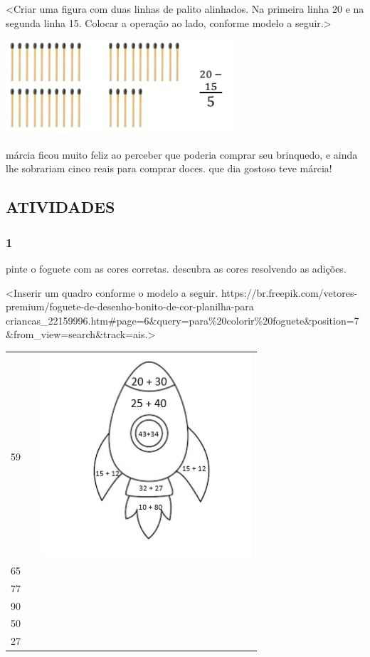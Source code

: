 \textless{}Criar uma figura com duas linhas de palito alinhados. Na
primeira linha 20 e na segunda linha 15. Colocar a operação ao lado,
conforme modelo a seguir.\textgreater{}

\includegraphics[width=3.31185in,height=1.38526in]{media/image14.png}

márcia ficou muito feliz ao perceber que poderia comprar seu brinquedo,
e ainda lhe sobrariam cinco reais para comprar doces. que dia gostoso
teve márcia!

\subsection{ATIVIDADES}\label{atividades-1}

\subsubsection{1}\label{section-8}

pinte o foguete com as cores corretas. descubra as cores resolvendo as
adições.

\textless{}Inserir um quadro conforme o modelo a seguir.
https://br.freepik.com/vetores-premium/foguete-de-desenho-bonito-de-cor-planilha-para
criancas\_22159996.htm\#page=6\&query=para\%20colorir\%20foguete\&position=7\&from\_view=search\&track=ais.\textgreater{}

\begin{longtable}[]{@{}lll@{}}
\toprule
59 & &
\includegraphics[width=3.09611in,height=2.97268in]{media/image15.png}\tabularnewline
65 & &\tabularnewline
77 & &\tabularnewline
90 & &\tabularnewline
50 & &\tabularnewline
27 & &\tabularnewline
\bottomrule
\end{longtable}

